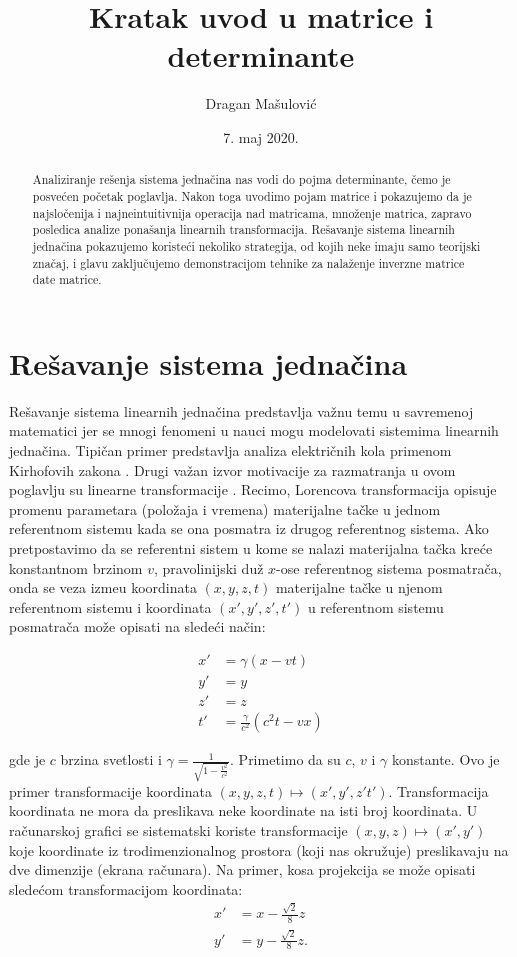 \documentclass[11pt]{article}
\title{Kratak uvod u matrice i determinante}
\author{Dragan Mašulović}
\date{7. maj 2020.}
\theoremstyle{masulthm}
\theoremstyle{masuldef}
\theoremstyle{masulexmp}
\theoremstyle{masulproof}
\begin{document}
\maketitle

\begin{abstract}

Analiziranje rešenja sistema jednačina nas vodi do pojma determinante, čemo je posvećen početak
poglavlja. Nakon toga uvodimo pojam matrice i pokazujemo da je najsločenija i najneintuitivnija
operacija nad matricama, množenje matrica, zapravo posledica analize ponašanja linearnih transformacija.
Rešavanje sistema linearnih jednačina pokazujemo koristeći nekoliko strategija, od kojih neke imaju
samo teorijski značaj, i glavu zaključujemo demonstracijom tehnike za nalaženje inverzne matrice date matrice.
    
\end{abstract}

\section{Rešavanje sistema jednačina}

Rešavanje sistema linearnih jednačina predstavlja važnu
temu u savremenoj matematici jer se mnogi fenomeni u nauci mogu modelovati
sistemima linearnih jednačina. Tipičan primer predstavlja analiza
električnih kola primenom Kirhofovih zakona \cite{boyd}.
Drugi važan izvor motivacije za razmatranja u ovom poglavlju su linearne transformacije \cite{axler}.
Recimo, Lorencova transformacija opisuje promenu parametara (položaja i vremena) materijalne tačke
u jednom referentnom sistemu kada se ona posmatra iz drugog referentnog sistema. Ako pretpostavimo
da se referentni sistem u kome se nalazi materijalna tačka kreće konstantnom brzinom $ v $, pravolinijski
duž $ x $-ose referentnog sistema posmatrača, onda se veza izme\dj u koordinata
$ (x, y, z, t) $ materijalne tačke
u njenom referentnom sistemu i koordinata $ (x', y', z', t') $ u referentnom sistemu posmatrača
može opisati na sledeći način:

\begin{align*}
    x' & = \gamma (x - vt) \\
    y' & = y \\
    z' & = z \\
    t' & = \frac{\gamma}{c^2}(c^2 t - vx)
\end{align*}

\noindent
gde je $ c $ brzina svetlosti i $ \gamma = \frac{1}{\sqrt{1 - \frac{v^2}{c^2}}} $. Primetimo da su
$ c $, $ v $ i $ \gamma $
konstante. Ovo je primer transformacije koordinata $ (x, y, z, t) \mapsto (x', y', z' t') $.
Transformacija koordinata ne mora da preslikava neke koordinate na isti broj koordinata. U računarskoj
grafici se sistematski koriste transformacije $ (x, y, z) \mapsto (x' , y') $ koje koordinate iz trodimenzionalnog
prostora (koji nas okružuje) preslikavaju na dve dimenzije (ekrana računara). Na primer, kosa projekcija
se može opisati sledećom transformacijom koordinata:
\begin{align*}
    x' & = x - \frac{\sqrt{2}}{8} z \\
    y' & = y - \frac{\sqrt{2}}{8} z.
\end{align*}
\end{document}
